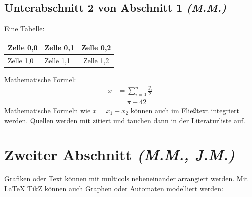 \documentclass{article}
\newcommand{\initials}[1]{\small{\textit{(#1)}} \normalsize}
\begin{document}
\subsection{Unterabschnitt 2 von Abschnitt 1 \initials{M.M.}}
Eine Tabelle:
\par\medskip %
\begin{tabular}{|l|p{4cm}|c|} %
    \hline
    Zelle 0,0 & Zelle 0,1 & Zelle 0,2 \\ %
    \hline
    Zelle 1,0 & Zelle 1,1 & Zelle 1,2 \\
    \hline
\end{tabular}
\par\smallskip

Mathematische Formel:
\begin{align*} %
    x &= {\sum}_{i=0}^{n} \frac{y_i}{2} \\ %
      &= \pi - 42
\end{align*}
Mathematische Formeln wie $x=x_1 +x_2$ können auch im Fließtext integriert werden. Quellen werden mit \cite{AB12} zitiert und tauchen dann in der Literaturliste auf.

\section{Zweiter Abschnitt \initials{M.M., J.M.}}
Grafiken oder Text können mit multicols nebeneinander arrangiert werden. Mit LaTeX TikZ können auch Graphen oder Automaten modelliert werden:
\end{document}
